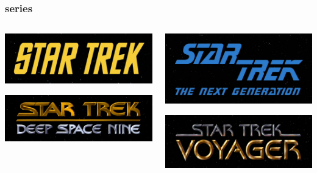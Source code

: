 \documentclass{beamer}
\begin{document}
\begin{frame}
  \frametitle{series}
  \begin{columns}
    \begin{column}{0.5\textwidth}
      \includegraphics[width = \textwidth, keepaspectratio = true]{figure/tos}

      \includegraphics[width = \textwidth, keepaspectratio = true]{figure/ds9}
    \end{column}
    \begin{column}{0.5\textwidth}
      \includegraphics[width = \textwidth, keepaspectratio = true]{figure/tng}

      \includegraphics[width = \textwidth, keepaspectratio = true]{figure/voy}
    \end{column}
  \end{columns}
\end{frame}
\end{document}
